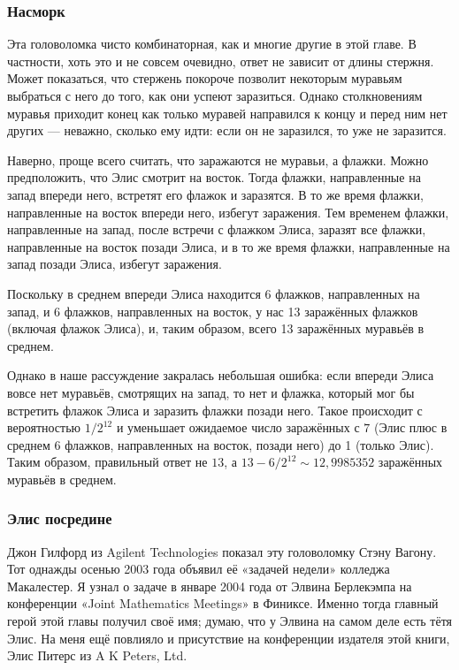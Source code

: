 \subsubsection*{Насморк}

Эта головоломка чисто комбинаторная, как и многие другие в этой главе.
В частности, хоть это и не совсем очевидно, ответ не зависит от длины стержня.
Может показаться, что стержень покороче позволит некоторым муравьям выбраться с него до того, как они успеют заразиться.
Однако столкновениям муравья приходит конец как только муравей направился к концу и перед ним нет других --- неважно, сколько ему идти: если он не заразился, то уже не заразится.

Наверно, проще всего считать, что заражаются не муравьи, а флажки.
Можно предположить, что Элис смотрит на восток.
Тогда флажки, направленные на запад впереди него, встретят его флажок и заразятся.
В то же время флажки, направленные на восток впереди него, избегут заражения.
Тем временем флажки, направленные на запад, после встречи с флажком Элиса, заразят все флажки, направленные на восток позади Элиса, и в то же время флажки, направленные на запад позади Элиса, избегут заражения.

Поскольку в среднем впереди Элиса находится 6 флажков, направленных на запад, и 6 флажков, направленных на восток, у нас 13 заражённых флажков (включая флажок Элиса), и, таким образом, всего 13 заражённых муравьёв в среднем.

Однако в наше рассуждение закралась небольшая ошибка: если впереди Элиса вовсе нет муравьёв, смотрящих на запад, то нет и флажка, который мог бы встретить флажок Элиса и заразить флажки позади него.
Такое происходит с вероятностью $1/2^{12}$ и уменьшает ожидаемое число заражённых с $7$ (Элис плюс в среднем 6 флажков, направленных на восток, позади него) до 1 (только Элис).
Таким образом, правильный ответ не $13$, а $13 - 6/2^{12} \sim 12{,}9985352$ заражённых муравьёв в среднем.

\subsubsection*{Элис посредине}

Джон Гилфорд из Agilent Technologies показал эту головоломку Стэну Вагону.
Тот однажды осенью 2003 года объявил её «задачей недели» колледжа Макалестер.
Я узнал о задаче в январе 2004 года от Элвина Берлекэмпа на конференции «Joint Mathematics Meetings» в Финиксе.
Именно тогда главный герой этой главы получил своё имя;
думаю, что у Элвина на самом деле есть тётя Элис.
На меня ещё повлияло и присутствие на конференции издателя этой книги, Элис Питерс из A K Peters, Ltd.

